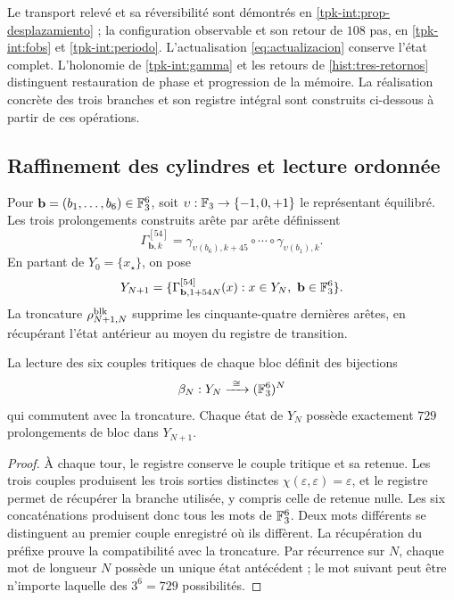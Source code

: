 Le transport relevé et sa réversibilité sont démontrés en \ref{tpk-int:prop-desplazamiento} ; la configuration observable et son retour de $108$ pas, en \ref{tpk-int:fobs} et \ref{tpk-int:periodo}. L’actualisation \eqref{eq:actualizacion} conserve l’état complet. L’holonomie de \ref{tpk-int:gamma} et les retours de \ref{hist:tres-retornos} distinguent restauration de phase et progression de la mémoire. La réalisation concrète des trois branches et son registre intégral sont construits ci-dessous à partir de ces opérations.



\subsection{Raffinement des cylindres et lecture ordonnée}
\label{hmtfg:refinamiento-ordenado}

Pour \(\mathbf b=(b_1,\ldots,b_6)\in\mathbb F_3^6\), soit
\(\upsilon:\mathbb F_3\to\{-1,0,+1\}\) le représentant équilibré. Les trois prolongements construits arête par arête définissent
\[
 \Gamma^{[54]}_{\mathbf b,k}
 =\gamma_{\upsilon(b_6),k+45}\circ\cdots\circ
   \gamma_{\upsilon(b_1),k}.
\]
En partant de \(Y_0=\{x_\star\}\), on pose
\[
 Y_{N+1}
 =\{\Gamma^{[54]}_{\mathbf b,1+54N}(x):
          x\in Y_N,\ \mathbf b\in\mathbb F_3^6\}.
\]
La troncature \(\rho^{\rm blk}_{N+1,N}\) supprime les cinquante-quatre dernières arêtes, en récupérant l’état antérieur au moyen du registre de transition.

\begin{proposition}
\label{hmtfg:bloques-729}
La lecture des six couples tritiques de chaque bloc définit des bijections
\[
 \beta_N:Y_N\xrightarrow{\ \cong\ }(\FF_3^6)^N
\]
qui commutent avec la troncature. Chaque état de \(Y_N\) possède exactement \(729\) prolongements de bloc dans \(Y_{N+1}\).
\end{proposition}
\begin{proof}
À chaque tour, le registre conserve le couple tritique et sa retenue. Les trois couples produisent les trois sorties distinctes \(\chi(\varepsilon,\varepsilon)=\varepsilon\), et le registre permet de récupérer la branche utilisée, y compris celle de retenue nulle. Les six concaténations produisent donc tous les mots de \(\mathbb F_3^6\). Deux mots différents se distinguent au premier couple enregistré où ils diffèrent. La récupération du préfixe prouve la compatibilité avec la troncature. Par récurrence sur \(N\), chaque mot de longueur \(N\) possède un unique état antécédent ; le mot suivant peut être n’importe laquelle des \(3^6=729\) possibilités.
\end{proof}

